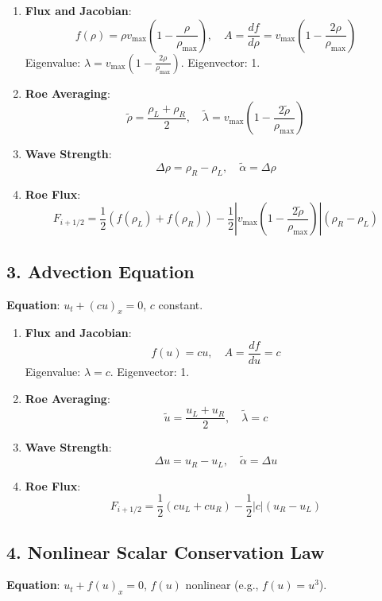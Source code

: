 \documentclass[12pt]{article}
\begin{document}
\begin{enumerate}
    \item \textbf{Flux and Jacobian}:
    \[
    f(\rho) = \rho v_{\text{max}} \left(1 - \frac{\rho}{\rho_{\text{max}}}\right), \quad A = \frac{df}{d\rho} = v_{\text{max}} \left(1 - \frac{2\rho}{\rho_{\text{max}}}\right)
    \]
    Eigenvalue: \(\lambda = v_{\text{max}} \left(1 - \frac{2\rho}{\rho_{\text{max}}}\right)\). Eigenvector: 1.

    \item \textbf{Roe Averaging}:
    \[
    \tilde{\rho} = \frac{\rho_L + \rho_R}{2}, \quad \tilde{\lambda} = v_{\text{max}} \left(1 - \frac{2\tilde{\rho}}{\rho_{\text{max}}}\right)
    \]

    \item \textbf{Wave Strength}:
    \[
    \Delta \rho = \rho_R - \rho_L, \quad \tilde{\alpha} = \Delta \rho
    \]

    \item \textbf{Roe Flux}:
    \[
    F_{i+1/2} = \frac{1}{2} \left( f(\rho_L) + f(\rho_R) \right) - \frac{1}{2} \left| v_{\text{max}} \left(1 - \frac{2\tilde{\rho}}{\rho_{\text{max}}}\right) \right| (\rho_R - \rho_L)
    \]
\end{enumerate}

\subsection*{3. Advection Equation}
\textbf{Equation}: \( u_t + (c u)_x = 0 \), \( c \) constant.

\begin{enumerate}
    \item \textbf{Flux and Jacobian}:
    \[
    f(u) = c u, \quad A = \frac{df}{du} = c
    \]
    Eigenvalue: \(\lambda = c\). Eigenvector: 1.

    \item \textbf{Roe Averaging}:
    \[
    \tilde{u} = \frac{u_L + u_R}{2}, \quad \tilde{\lambda} = c
    \]

    \item \textbf{Wave Strength}:
    \[
    \Delta u = u_R - u_L, \quad \tilde{\alpha} = \Delta u
    \]

    \item \textbf{Roe Flux}:
    \[
    F_{i+1/2} = \frac{1}{2} \left( c u_L + c u_R \right) - \frac{1}{2} |c| (u_R - u_L)
    \]
\end{enumerate}

\subsection*{4. Nonlinear Scalar Conservation Law}
\textbf{Equation}: \( u_t + f(u)_x = 0 \), \( f(u) \) nonlinear (e.g., \( f(u) = u^3 \)).
\end{document}
